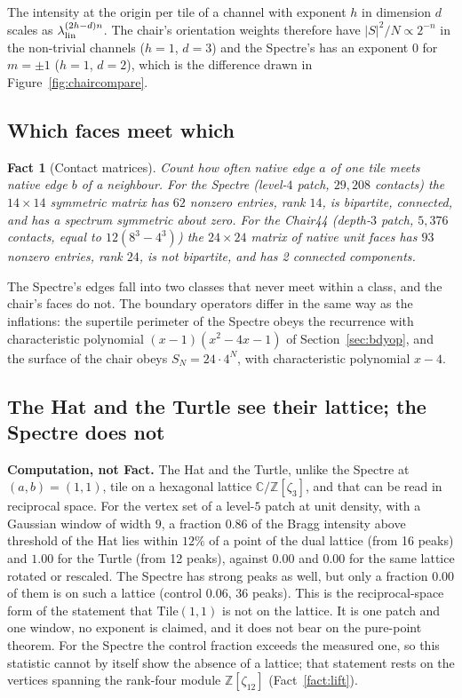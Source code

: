 \documentclass[11pt]{article}
\newtheorem{fact}{Fact}
\theoremstyle{definition}
\theoremstyle{remark}
\newcommand{\lam}{\lambda}
\begin{document}
\noindent
The intensity at the origin per tile of a channel with exponent $h$ in dimension $d$ scales as
$\lam_{\rm lin}^{(2h-d)n}$.  The chair's orientation weights therefore have $|S|^{2}/N\propto 2^{-n}$ in the non-trivial channels
($h=1$, $d=3$) and the Spectre's has an exponent $0$ for $m=\pm1$ ($h=1$, $d=2$), which is the difference drawn in
Figure~\ref{fig:chaircompare}.

\subsection{Which faces meet which}

\begin{fact}[Contact matrices]
\label{fact:contacts}
Count how often native edge $a$ of one tile meets native edge $b$ of a neighbour.  For the Spectre (level-$4$ patch,
$29{,}208$ contacts) the $14\times14$ symmetric matrix has $62$ nonzero entries, rank $14$, is bipartite, connected, and has
a spectrum symmetric about zero.  For the Chair44 (depth-$3$ patch, $5{,}376$ contacts, equal to $12(8^{3}-4^{3})$) the
$24\times24$ matrix of native unit faces has $93$ nonzero entries, rank $24$, is not bipartite, and has
2 connected components.
\end{fact}

\noindent
The Spectre's edges fall into two classes that never meet within a class, and the chair's faces do not.  The boundary
operators differ in the same way as the inflations: the supertile perimeter of the Spectre obeys the recurrence with
characteristic polynomial $(x-1)(x^{2}-4x-1)$ of Section~\ref{sec:bdyop}, and the surface of the chair obeys
$S_{N}=24\cdot4^{N}$, with characteristic polynomial $x-4$.


\subsection{The Hat and the Turtle see their lattice; the Spectre does not}

\textbf{Computation, not Fact.}  The Hat and the Turtle, unlike the Spectre at $(a,b)=(1,1)$, tile on a hexagonal lattice
$\mathbb{C}/\mathbb{Z}[\zeta_3]$, and that can be read in reciprocal space.  For the vertex set of a level-$5$ patch at unit
density, with a Gaussian window of width $9$, a fraction $0.86$ of the Bragg intensity above threshold of the Hat lies within
$12\%$ of a point of the dual lattice (from 16 peaks) and $1.00$ for the Turtle (from 12 peaks), against $0.00$ and $0.00$ for
the same lattice rotated or rescaled.  The Spectre has strong peaks as well, but only a fraction $0.00$ of them is on such a
lattice (control $0.06$, 36 peaks).  This is the reciprocal-space form of the statement that $\mathrm{Tile}(1,1)$ is not on the
lattice.  It is one patch and one window, no exponent is claimed, and it does not bear on the pure-point theorem.  For the
Spectre the control fraction exceeds the measured one, so this statistic cannot by itself show the absence of a lattice;
that statement rests on the vertices spanning the rank-four module $\mathbb{Z}[\zeta_{12}]$ (Fact~\ref{fact:lift}).
\end{document}
